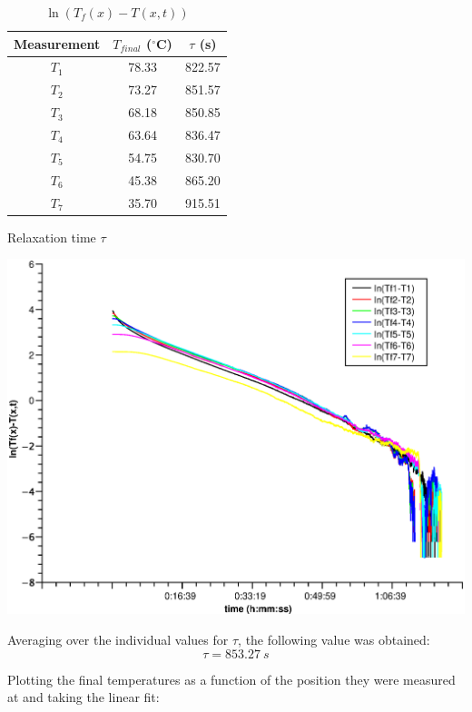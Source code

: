 \documentclass{scrartcl}
\begin{document}
\begin{table}[H]%
\centering
\parbox{0.4\textwidth}{
\begin{footnotesize}
    \begin{tabular}{c|c|c}
        Measurement & $T_{final}$ ($^\circ$C) & $\tau$ (s)\\
        \hline
        $T_1$ & 78.33 & 822.57\\
        $T_2$ & 73.27 & 851.57\\
        $T_3$ & 68.18 & 850.85\\
        $T_4$ & 63.64 & 836.47\\
        $T_5$ & 54.75 & 830.70\\
        $T_6$ & 45.38 & 865.20\\
        $T_7$ & 35.70 & 915.51
    \end{tabular}
\end{footnotesize}
\caption{Relaxation time $\tau$}
\label{tab:table}
}
\qquad
\begin{minipage}[c]{0.53\textwidth}%
\centering
    \includegraphics[width=1\textwidth]{lnTf_T.eps}
\caption{$\ln(T_f(x)-T(x,t))$}
\label{fig:figure}
\end{minipage}
\end{table}

Averaging over the individual values for $\tau$, the following value was obtained:
\[\tau=853.27 \ s\]

Plotting the final temperatures as a function of the position they were measured at and taking the linear fit:
\end{document}
